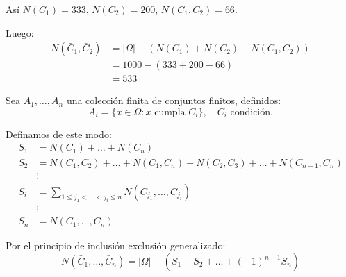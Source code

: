 Así $N(C_1) = 333$, $N(C_2) = 200$, $N(C_1, C_2) = 66$.

Luego:
\begin{align*}
	N(\bar{C}_1, \bar{C}_2) & = |\Omega| - (N(C_1) + N(C_2) - N(C_1, C_2)) \\
	                        & = 1000 - (333 + 200 - 66)                    \\
	                        & = 533
\end{align*}

Sea $A_1, \dots, A_n$ una colección finita de conjuntos finitos, definidos:
\begin{equation*}
	A_i = \{ x \in \Omega : x \text{ cumpla } C_i \}, \quad C_i \text{ condición.}
\end{equation*}

Definamos de este modo:
\begin{align*}
	S_1 & = N(C_1) + \dots + N(C_n)                                                   \\
	S_2 & = N(C_1, C_2) + \dots + N(C_1, C_n) + N(C_2, C_3) + \dots + N(C_{n-1}, C_n) \\
	    & \vdots                                                                      \\
	S_i & = \sum_{1 \le j_1 < \dots < j_i \le n} N(C_{j_1}, \dots, C_{j_i})           \\
	    & \vdots                                                                      \\
	S_n & = N(C_1, \dots, C_n)
\end{align*}

Por el principio de inclusión exclusión generalizado:
\begin{equation*}
	N(\bar{C}_1, \dots, \bar{C}_n) = |\Omega| - \left( S_1 - S_2 + \dots + (-1)^{n-1} S_n \right)
\end{equation*}
